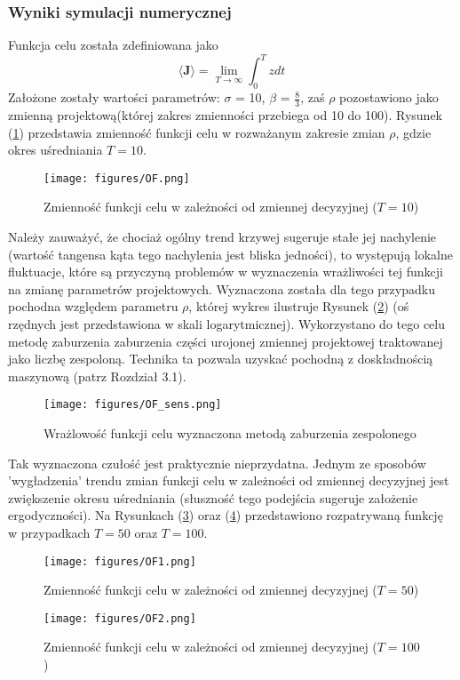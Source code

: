 \documentclass[12pt]{article}
\begin{document}
\subsubsection{Wyniki symulacji numerycznej}
Funkcja celu została zdefiniowana jako
\begin{equation}
\langle\textbf{J}\rangle = \lim\limits_{\textit{T}\to\infty}\int_{0}^{T}zdt
\label{lorenz_J}
\end{equation} 
Założone zostały wartości parametrów: $\sigma$ = 10, $\beta$ = $\frac{8}{3}$, zaś $\rho$ pozostawiono jako zmienną projektową(której zakres zmienności przebiega od 10 do 100). Rysunek (\ref{Fig16}) przedstawia zmienność funkcji celu w rozważanym zakresie zmian $ \rho $, gdzie okres uśredniania $ T = 10 $.
\begin{figure}[H]
	\texttt{[image: figures/OF.png]} 
	\centering
	\caption{Zmienność funkcji celu w zależności od zmiennej decyzyjnej ($ T=10 $)}
	\label{Fig16}
\end{figure}
Należy zauważyć, że chociaż ogólny trend krzywej sugeruje stałe jej nachylenie (wartość tangensa kąta tego nachylenia jest bliska jedności), to występują lokalne fluktuacje, które są przyczyną problemów w wyznaczenia wrażliwości tej funkcji na zmianę parametrów projektowych. Wyznaczona została dla tego przypadku pochodna względem parametru $ \rho $, której wykres ilustruje Rysunek (\ref{Fig17}) (oś rzędnych jest przedstawiona w skali logarytmicznej). Wykorzystano do tego celu metodę zaburzenia zaburzenia części urojonej zmiennej projektowej traktowanej jako liczbę zespoloną. Technika ta pozwala uzyskać pochodną z doskładnością maszynową (patrz Rozdział 3.1).
\begin{figure}[H]
	\texttt{[image: figures/OF\_sens.png]} 
	\centering
	\caption{Wrażlowość funkcji celu wyznaczona metodą zaburzenia zespolonego}
	\label{Fig17}
\end{figure}
Tak wyznaczona czułość jest praktycznie nieprzydatna. Jednym ze sposobów 'wygładzenia' trendu zmian funkcji celu w zależności od zmiennej decyzyjnej jest zwiększenie okresu uśredniania (słuszność tego podejścia sugeruje założenie ergodyczności). Na Rysunkach (\ref{Fig18}) oraz (\ref{Fig19}) przedstawiono rozpatrywaną funkcję w przypadkach $ T = 50 $ oraz $ T = 100 $.
\begin{figure}[H]
	\texttt{[image: figures/OF1.png]} 
	\centering
	\caption{Zmienność funkcji celu w zależności od zmiennej decyzyjnej ($ T=50 $)}
	\label{Fig18}
\end{figure}
\begin{figure}[H]
	\texttt{[image: figures/OF2.png]} 
	\centering
	\caption{Zmienność funkcji celu w zależności od zmiennej decyzyjnej ($ T=100 $)}
	\label{Fig19}
\end{figure}
\end{document}
